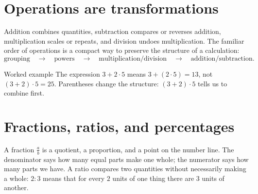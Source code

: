 \documentclass[11pt,oneside,openany]{book}
\newenvironment{example}{\begin{intuitionbox}{Worked example}}{\end{intuitionbox}}
\begin{document}
\section{Operations are transformations}

Addition combines quantities, subtraction compares or reverses addition, multiplication scales or repeats, and division undoes multiplication. The familiar order of operations is a compact way to preserve the structure of a calculation:
\[
  \text{grouping} \quad\longrightarrow\quad \text{powers} \quad\longrightarrow\quad \text{multiplication/division} \quad\longrightarrow\quad \text{addition/subtraction}.
\]

\begin{example}
The expression $3+2\cdot 5$ means $3+(2\cdot5)=13$, not $(3+2)\cdot5=25$. Parentheses change the structure: $(3+2)\cdot5$ tells us to combine first.
\end{example}

\begin{center}
\end{center}

\section{Fractions, ratios, and percentages}

A fraction $\frac{a}{b}$ is a quotient, a proportion, and a point on the number line. The denominator says how many equal parts make one whole; the numerator says how many parts we have. A ratio compares two quantities without necessarily making a whole: $2:3$ means that for every $2$ units of one thing there are $3$ units of another.
\end{document}

